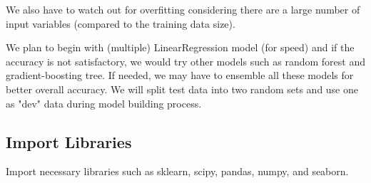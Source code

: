 \documentclass[11pt]{article}
\begin{document}
We also have to watch out for overfitting considering there are a large
number of input variables (compared to the training data size).

We plan to begin with (multiple) LinearRegression model (for speed) and
if the accuracy is not satisfactory, we would try other models such as
random forest and gradient-boosting tree. If needed, we may have to
ensemble all these models for better overall accuracy. We will split
test data into two random sets and use one as "dev" data during model
building process.

    \subsection{Import Libraries}\label{import-libraries}

Import necessary libraries such as sklearn, scipy, pandas, numpy, and
seaborn.
\end{document}
